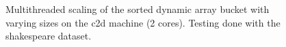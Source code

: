 \begin{landscape}
\begin{figure}[H]
{    }
    \label{fig:ts_c2d_shake_sorted}
    \caption{Multithreaded scaling of the sorted dynamic array bucket with varying sizes on the
    c2d machine (2 cores). Testing done with the shakespeare dataset.}
\end{figure}
\begin{figure}[H]
\end{figure}
\end{landscape}
